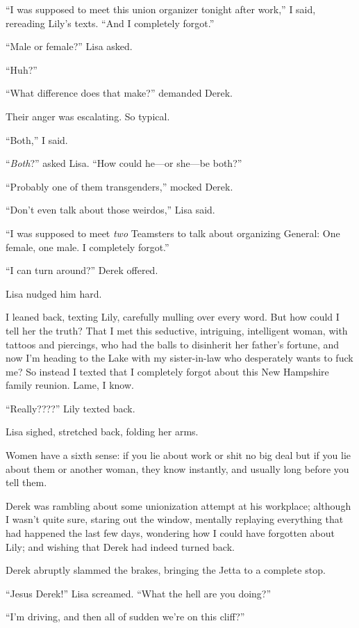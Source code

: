 ``I was supposed to meet this union organizer tonight after work,'' I
said, rereading Lily's texts. ``And I completely forgot.''

``Male or female?'' Lisa asked.

``Huh?''

``What difference does that make?'' demanded Derek.

Their anger was escalating. So typical.

``Both,'' I said.

``\emph{Both}?'' asked Lisa. ``How could he---or she---be both?''

``Probably one of them transgenders,'' mocked Derek.

``Don't even talk about those weirdos,'' Lisa said.

``I was supposed to meet \emph{two} Teamsters to talk about organizing
General: One female, one male. I completely forgot.''

``I can turn around?'' Derek offered.

Lisa nudged him hard.

I leaned back, texting Lily, carefully mulling over every word. But how
could I tell her the truth? That I met this seductive, intriguing,
intelligent woman, with tattoos and piercings, who had the balls to
disinherit her father's fortune, and now I'm heading to the Lake with my
sister-in-law who desperately wants to fuck me? So instead I texted that
I completely forgot about this New Hampshire family reunion. Lame, I
know.

``Really????'' Lily texted back.

Lisa sighed, stretched back, folding her arms.

Women have a sixth sense: if you lie about work or shit no big deal but
if you lie about them or another woman, they know instantly, and usually
long before you tell them.

Derek was rambling about some unionization attempt at his workplace;
although I wasn't quite sure, staring out the window, mentally replaying
everything that had happened the last few days, wondering how I could
have forgotten about Lily; and wishing that Derek had indeed turned
back.

Derek abruptly slammed the brakes, bringing the Jetta to a complete
stop.

``Jesus Derek!'' Lisa screamed. ``What the hell are you doing?''

``I'm driving, and then all of sudden we're on this cliff?''

